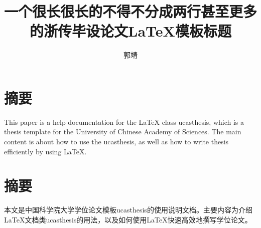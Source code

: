 \confidential{}%
\title{一个很长很长的不得不分成两行甚至更多的浙传毕设论文\LaTeX{}模板标题}%
\author{郭靖}%
\advisorsec{}%
\chinesedate{\today}%
\englishdate{\today}%
\maketitle%
\makedeclaration%
\nofootermatter
\chapter*{摘要}%

This paper is a help documentation for the \LaTeX{} class ucasthesis, which is  a thesis template for the University of Chinese Academy of Sciences. The main content is about how to use the ucasthesis, as well as how to write thesis efficiently by using \LaTeX{}.

\chapter*{摘要}%

本文是中国科学院大学学位论文模板ucasthesis的使用说明文档。主要内容为介绍\LaTeX{}文档类ucasthesis的用法，以及如何使用\LaTeX{}快速高效地撰写学位论文。

